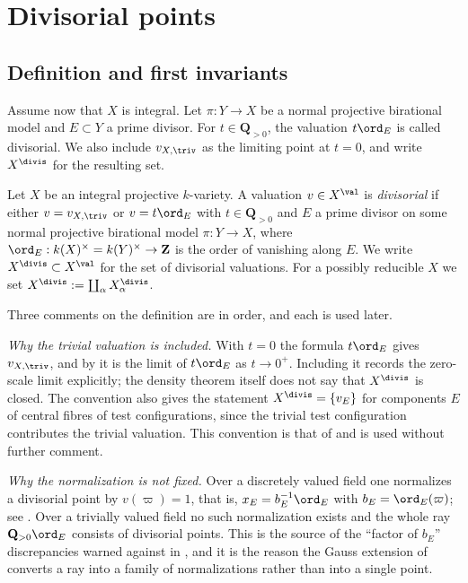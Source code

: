 \section{Divisorial points}
\label{sec:ch32-divisorial}

\subsection{Definition and first invariants}
\label{sec:ch32-divisorial-def}

Assume now that $X$ is integral.  Let $\pi:Y\to X$ be a normal
projective birational model and $E\subset Y$ a prime divisor.  For
$t\in\mathbf Q_{>0}$, the valuation $t\ord_E$ is called divisorial.  We
also include $v_{X,\triv}$ as the limiting point at $t=0$, and write
$X^{\divis}$ for the resulting set.

\begin{definition}
\label{def:ch32-divisorial}
Let $X$ be an integral projective $k$-variety.  A valuation
$v\in X^{\val}$ is \emph{divisorial} if either $v=v_{X,\triv}$ or
$v=t\ord_E$ with $t\in\mathbf Q_{>0}$ and $E$ a prime divisor on some
normal projective birational model $\pi:Y\to X$, where
$\ord_E:k(X)^\times=k(Y)^\times\to\mathbf Z$ is the order of vanishing
along $E$.  We write $X^{\divis}\subset X^{\val}$ for the set of
divisorial valuations.  For a possibly reducible $X$ we set
$X^{\divis}:=\coprod_\alpha X_\alpha^{\divis}$.
\end{definition}

Three comments on the definition are in order, and each is used later.

\emph{Why the trivial valuation is included.}  With $t=0$ the formula
$t\ord_E$ gives $v_{X,\triv}$, and by
 it is the limit of $t\ord_E$ as
$t\to0^+$.  Including it records the zero-scale limit explicitly; the density
theorem itself does not say that $X^{\divis}$ is closed.  The convention
also gives
the statement $X^{\divis}=\{v_E\}$ for components $E$ of central fibres
of test configurations, since the trivial test configuration contributes the
trivial valuation.  This convention is that of
\cite[\S1.1.1]{BJ22} and is used without further comment.

\emph{Why the normalization is not fixed.}  Over a discretely valued field
one normalizes a divisorial point by $v(\varpi)=1$, that is,
$x_E=b_E^{-1}\ord_E$ with $b_E=\ord_E(\varpi)$; see
.  Over a trivially valued field no such
normalization exists and the whole ray $\mathbf Q_{>0}\ord_E$ consists of
divisorial points.  This is the source of the ``factor of $b_E$''
discrepancies warned against in , and it is the
reason the Gauss extension of  converts a ray into a
family of normalizations rather than into a single point.

